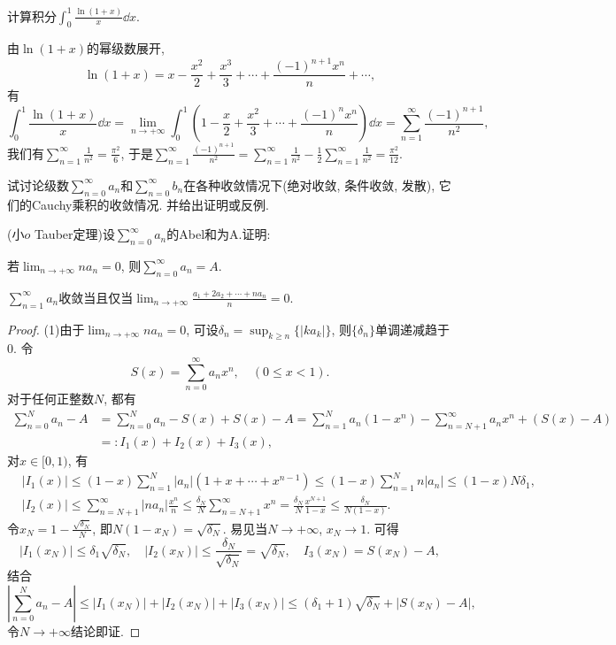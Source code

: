\begin{quizb}
\woe 计算积分\(\int_{0}^{1}\frac{\ln(1+x)}{x}\dd x.\)
\begin{solution}
由\(\ln(1+x)\)的幂级数展开, \[\ln(1+x)=x-\frac{x^2}{2}+\frac{x^3}{3}+\cdots+\frac{(-1)^{n+1}x^n}{n}+\cdots,\]有\[\int_{0}^{1}\frac{\ln(1+x)}{x}\dd x=\lim_{n\rightarrow+\infty}\int_{0}^{1}\left(1-\frac{x}{2}+\frac{x^2}{3}+\cdots+\frac{(-1)^nx^n}{n}\right)\dd x=\sum_{n=1}^{\infty}\frac{(-1)^{n+1}}{n^2},\]
我们有\(\sum_{n=1}^{\infty}\frac{1}{n^2}=\frac{\pi^2}{6}\), 于是\(\sum_{n=1}^{\infty}\frac{(-1)^{n+1}}{n^2}=\sum_{n=1}^{\infty}\frac{1}{n^2}-\frac{1}{2}\sum_{n=1}^{\infty}\frac{1}{n^2}=\frac{\pi^2}{12}.\)
\end{solution}
\woe 试讨论级数\(\sum_{n=0}^{\infty}a_n\)和\(\sum_{n=0}^{\infty}b_n\)在各种收敛情况下(绝对收敛, 条件收敛, 发散), 它们的Cauchy乘积的收敛情况. 并给出证明或反例.
\begin{solution}

\end{solution}
\woe (小\(o\) Tauber定理)设\(\sum_{n=0}^{\infty}a_n\)的Abel和为A.证明:
\begin{quizs}
\item 若\(\lim_{n\rightarrow+\infty}na_n=0\), 则\(\sum_{n=0}^{\infty}a_n=A\).
\item \(\sum_{n=1}^{\infty}a_n\)收敛当且仅当\(\lim_{n\rightarrow+\infty}\frac{a_1+2a_2+\cdots+na_n}{n}=0.\)
\end{quizs}
\begin{proof}
(1)由于\(\lim_{n\rightarrow+\infty}na_n=0\), 可设\(\delta_n=\sup_{k\geqslant n}\{\left|k a_k\right|\}\), 则\(\{\delta_n\}\)单调递减趋于0. 令\[S(x)=\sum_{n=0}^{\infty}a_nx^n,\quad (0\leqslant x<1).\]对于任何正整数\(N\), 都有\[\begin{split}
\sum_{n=0}^{N}a_n-A&=\sum_{n=0}^{N}a_n-S(x)+S(x)-A=\sum_{n=1}^{N}a_n(1-x^n)-\sum_{n=N+1}^{\infty}a_nx^n+\left(S(x)-A\right)\\&=:I_1(x)+I_2(x)+I_3(x),
\end{split}\]对\(x\in[0,1)\), 有\[\begin{split}
&\left|I_1(x)\right|\leqslant (1-x)\sum_{n=1}^{N}|a_n|(1+x+\cdots+x^{n-1})\leqslant (1-x)\sum_{n=1}^{N}n|a_n|\leqslant (1-x)N\delta_1,\\
&\left|I_2(x)\right|\leqslant \sum_{n=N+1}^{\infty}|na_n|\frac{x^n}{n}\leqslant\frac{\delta_N}{N}\sum_{n=N+1}^{\infty}x^n=\frac{\delta_N}{N}\frac{x^{N+1}}{1-x}\leqslant\frac{\delta_N}{N(1-x)}.
\end{split}\]令\(x_N=1-\frac{\sqrt{\delta_N}}{N}\), 即\(N(1-x_N)=\sqrt{\delta_N}\). 易见当\(N\rightarrow+\infty\), \(x_N\rightarrow 1\). 可得\[|I_1(x_N)|\leqslant\delta_1\sqrt{\delta_N},\quad \left|I_2(x_N)\right|\leqslant\frac{\delta_N}{\sqrt{\delta_N}}=\sqrt{\delta_N},\quad I_3(x_N)=S(x_N)-A,\]结合\[\left|\sum_{n=0}^{N}a_n-A\right|\leqslant|I_1(x_N)|+|I_2(x_N)|+|I_3(x_N)|\leqslant (\delta_1+1)\sqrt{\delta_N}+\left|S(x_N)-A\right|,\]令\(N\rightarrow+\infty\)结论即证.


\end{proof}
\end{quizb}
